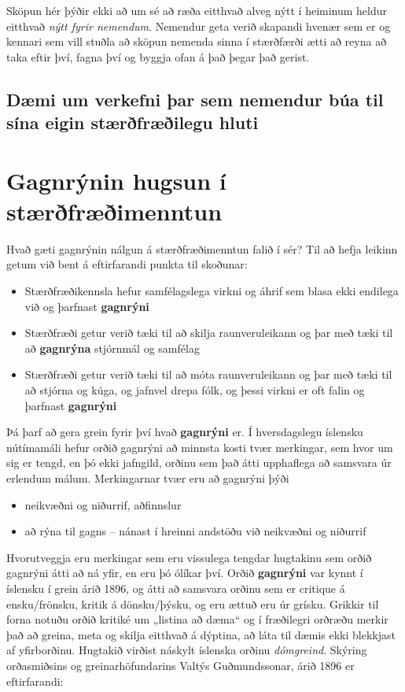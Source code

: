 \documentclass[
  icelandic,
]{book}
\providecommand{\tightlist}{%
  \setlength{\itemsep}{0pt}\setlength{\parskip}{0pt}}
\begin{document}
Sköpun hér þýðir ekki að um sé að ræða eitthvað alveg nýtt í heiminum heldur eitthvað \emph{nýtt fyrir nemendum}. Nemendur geta verið skapandi hvenær sem er og kennari sem vill stuðla að sköpun nemenda sinna í stærðfærði ætti að reyna að taka eftir því, fagna því og byggja ofan á það þegar það gerist.

\section{Dæmi um verkefni þar sem nemendur búa til sína eigin stærðfræðilegu hluti}\label{duxe6mi-um-verkefni-uxfear-sem-nemendur-buxfaa-til-suxedna-eigin-stuxe6ruxf0fruxe6uxf0ilegu-hluti}

\chapter{Gagnrýnin hugsun í stærðfræðimenntun}\label{gagnryni}

Hvað gæti gagnrýnin nálgun á stærðfræðimenntun falið í sér? Til að hefja leikinn getum við bent á eftirfarandi punkta til skoðunar:

\begin{itemize}
\tightlist
\item
  Stærðfræðikennsla hefur samfélagslega virkni og áhrif sem blasa ekki endilega við og þarfnast \textbf{gagnrýni}
\item
  Stærðfræði getur verið tæki til að skilja raunveruleikann og þar með tæki til að \textbf{gagnrýna} stjórnmál og samfélag
\item
  Stærðfræði getur verið tæki til að móta raunveruleikann og þar með tæki til að stjórna og kúga, og jafnvel drepa fólk, og þessi virkni er oft falin og þarfnast \textbf{gagnrýni}
\end{itemize}

Þá þarf að gera grein fyrir því hvað \textbf{gagnrýni} er. Í hversdagslegu íslensku nútímamáli hefur orðið gagnrýni að minnsta kosti tvær merkingar, sem hvor um sig er tengd, en þó ekki jafngild, orðinu sem það átti upphaflega að samsvara úr erlendum málum. Merkingarnar tvær eru að gagnrýni þýði

\begin{itemize}
\tightlist
\item
  neikvæðni og niðurrif, aðfinnslur
\item
  að rýna til gagns -- nánast í hreinni andstöðu við neikvæðni og niðurrif
\end{itemize}

Hvorutveggja eru merkingar sem eru vissulega tengdar hugtakinu sem orðið gagnrýni átti að ná yfir, en eru þó ólíkar því. Orðið \textbf{gagnrýni} var kynnt í íslensku í grein árið 1896, og átti að samsvara orðinu sem er critique á ensku/frönsku, kritik á dönsku/þýsku, og eru ættuð eru úr grísku. Grikkir til forna notuðu orðið kritiké um „listina að dæma`` og í fræðilegri orðræðu merkir það að greina, meta og skilja eitthvað á dýptina, að láta til dæmis ekki blekkjast af yfirborðinu. Hugtakið virðist náskylt íslenska orðinu \emph{dómgreind}. Skýring orðasmiðsins og greinarhöfundarins Valtýs Guðmundssonar, árið 1896 er eftirfarandi:
\end{document}
